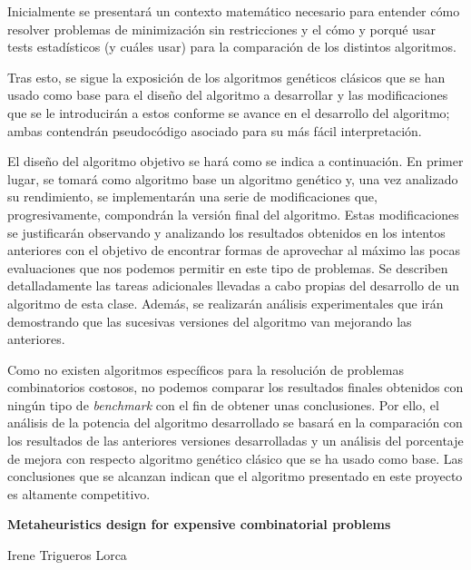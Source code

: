Inicialmente se presentará un contexto matemático necesario para entender cómo resolver problemas de minimización sin restricciones y el cómo y porqué usar tests estadísticos (y cuáles usar) para la comparación de los distintos algoritmos. 

Tras esto, se sigue la exposición de los algoritmos genéticos clásicos que se han usado como base para el diseño del algoritmo a desarrollar y las modificaciones que se le introducirán a estos conforme se avance en el desarrollo del algoritmo; ambas contendrán pseudocódigo asociado para su más fácil interpretación. 

El diseño del algoritmo objetivo se hará como se indica a continuación. 
En primer lugar, se tomará como algoritmo base un algoritmo genético y, una vez analizado su rendimiento, se implementarán una serie de modificaciones que, progresivamente, compondrán la versión final del algoritmo. 
Estas modificaciones se justificarán observando y analizando los resultados obtenidos en los intentos anteriores con el objetivo de encontrar formas de aprovechar al máximo las pocas evaluaciones que nos podemos permitir en este tipo de problemas. 
Se describen detalladamente las tareas adicionales llevadas a cabo propias del desarrollo de un algoritmo de esta clase. 
Además, se realizarán análisis experimentales que irán demostrando que las sucesivas versiones del algoritmo van mejorando las anteriores. 

Como no existen algoritmos específicos para la resolución de problemas combinatorios costosos, no podemos comparar los resultados finales obtenidos con ningún tipo de \textit{benchmark} con el fin de obtener unas conclusiones. 
Por ello, el análisis de la potencia del algoritmo desarrollado se basará en la comparación con los resultados de las anteriores versiones desarrolladas y un análisis del porcentaje de mejora con respecto algoritmo genético clásico que se ha usado como base. 
Las conclusiones que se alcanzan indican que el algoritmo presentado en este proyecto es altamente competitivo. 


\cleardoublepage


\thispagestyle{empty}


\begin{center}
{\large\bfseries Metaheuristics design for expensive combinatorial problems }\\
\end{center}
\begin{center}
Irene Trigueros Lorca\\
\end{center}

